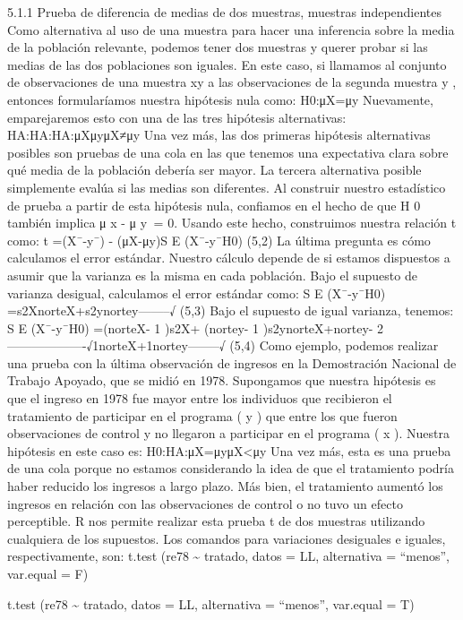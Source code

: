 \documentclass[
]{book}
\begin{document}
5.1.1 Prueba de diferencia de medias de dos muestras, muestras independientes
Como alternativa al uso de una muestra para hacer una inferencia sobre la media de la población relevante, podemos tener dos muestras y querer probar si las medias de las dos poblaciones son iguales. En este caso, si llamamos al conjunto de observaciones de una muestra xy a las observaciones de la segunda muestra y , entonces formularíamos nuestra hipótesis nula como:
H0:μX=μy
Nuevamente, emparejaremos esto con una de las tres hipótesis alternativas:
HA:HA:HA:μXμyμX≠μy
Una vez más, las dos primeras hipótesis alternativas posibles son pruebas de una cola en las que tenemos una expectativa clara sobre qué media de la población debería ser mayor. La tercera alternativa posible simplemente evalúa si las medias son diferentes. Al construir nuestro estadístico de prueba a partir de esta hipótesis nula, confiamos en el hecho de que H 0 también implica μ x - μ y  = 0. Usando este hecho, construimos nuestra relación t como:
t =(X¯-y¯) - (μX-μy)S E (X¯-y¯\textbar H0)
(5,2)
La última pregunta es cómo calculamos el error estándar. Nuestro cálculo depende de si estamos dispuestos a asumir que la varianza es la misma en cada población. Bajo el supuesto de varianza desigual, calculamos el error estándar como:
S E (X¯-y¯\textbar H0) =s2XnorteX+s2ynortey--------√
(5,3)
Bajo el supuesto de igual varianza, tenemos:
S E (X¯-y¯\textbar H0) =(norteX- 1 )s2X+ (nortey- 1 )s2ynorteX+nortey- 2-------------------√1norteX+1nortey--------√
(5,4)
Como ejemplo, podemos realizar una prueba con la última observación de ingresos en la Demostración Nacional de Trabajo Apoyado, que se midió en 1978. Supongamos que nuestra hipótesis es que el ingreso en 1978 fue mayor entre los individuos que recibieron el tratamiento de participar en el programa ( y ) que entre los que fueron observaciones de control y no llegaron a participar en el programa ( x ). Nuestra hipótesis en este caso es:
H0:HA:μX=μyμX\textless μy
Una vez más, esta es una prueba de una cola porque no estamos considerando la idea de que el tratamiento podría haber reducido los ingresos a largo plazo. Más bien, el tratamiento aumentó los ingresos en relación con las observaciones de control o no tuvo un efecto perceptible. R nos permite realizar esta prueba t de dos muestras utilizando cualquiera de los supuestos. Los comandos para variaciones desiguales e iguales, respectivamente, son:
t.test (re78 \textasciitilde{} tratado, datos = LL, alternativa = ``menos'', var.equal = F)

t.test (re78 \textasciitilde{} tratado, datos = LL, alternativa = ``menos'', var.equal = T)
\end{document}
